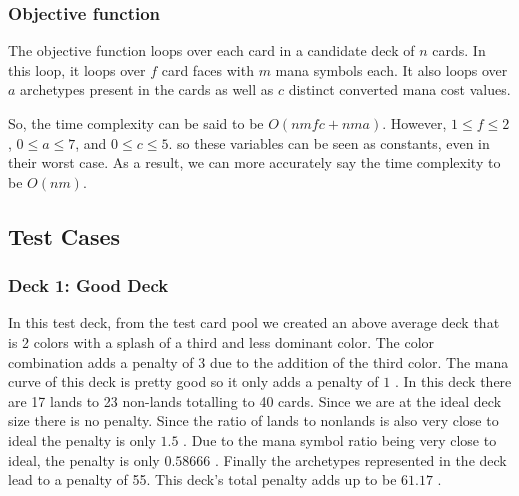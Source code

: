 \documentclass[12pt, letterpaper]{article}
\begin{document}


\subsubsection{Objective function}

The objective function loops over each card in a candidate deck of $ n $ cards.
In this loop,
it loops over $ f $ card faces with $ m $ mana symbols each.
It also loops over $ a $ archetypes present in the cards
as well as $ c $ distinct converted mana cost values.

So,
the time complexity can be said to be $ O(nmfc + nma) $.
However, $ 1 \le f \le 2 $, $ 0 \le a \le 7 $, and $ 0 \le c \le 5 $.
so these variables can be seen as constants, even in their worst case.
As a result,
we can more accurately say the time complexity to be $ O(nm) $.

\subsection{Test Cases}

\subsubsection{Deck 1: Good Deck}

In this test deck, from the test card pool we created an above average deck that is 2 colors with a splash of a third
and less dominant color. The color combination adds a penalty of $ 3 $ due to the addition of the third color.
The mana curve of this deck is pretty good so it only adds a penalty of $ 1 $ . In this deck there are 17 lands to
23 non-lands totalling to 40 cards. Since we are at the ideal deck size there is no penalty. Since the ratio of lands
to nonlands is also very close to ideal the penalty is only $ 1.5 $ . Due to the mana symbol ratio being very close
to ideal, the penalty is only $ 0.58666 $ . Finally the archetypes represented in the deck lead to a penalty of 55.
This deck's total penalty adds up to be $ 61.17 $ .
\end{document}
